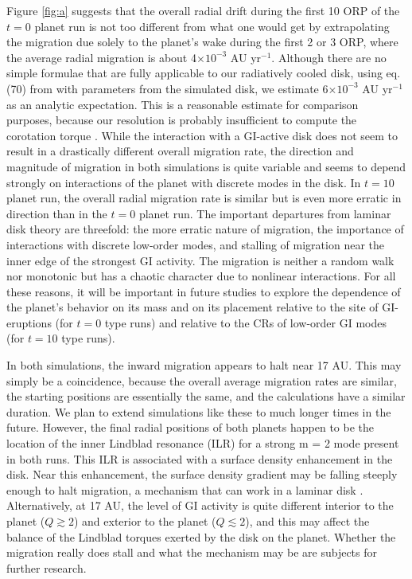 \documentclass[12pt,manuscript,authoryear]{aastex}
\begin{document}
Figure \ref{fig:a} suggests that the overall radial drift during the first 10 ORP of the $t = 0$ planet run is not too different from what one would get by extrapolating the migration due solely to the planet's wake during the first 2 or 3 ORP, where the average radial migration is about 4$\times10^{-3}$ AU yr$^{-1}$. Although there are no simple formulae that are fully applicable to our radiatively cooled disk, using eq. (70) from \citet{tanaka2002} with parameters from the simulated disk, we estimate 6$\times10^{-3}$ AU yr$^{-1}$ as an analytic expectation. This is a reasonable estimate for comparison purposes, because our resolution is probably insufficient to compute the corotation torque \citep{paardekooper2010}. 
While the interaction with a GI-active disk does not seem to result in a drastically different overall migration rate, the direction and magnitude of migration in both simulations is quite variable and seems to depend strongly on interactions of the planet with discrete modes in the disk. In $t = 10$ planet run, the overall radial migration rate is similar but is even more erratic in direction than in the $t = 0$ planet run. The important departures from laminar disk theory are threefold: the more erratic nature of migration, the importance of interactions with discrete low-order modes, and stalling of migration near the inner edge of the strongest GI activity. The migration is neither a random walk nor monotonic but has a chaotic character due to nonlinear interactions. For all these reasons, it will be important in future studies to explore the dependence of the planet's behavior on its mass and on its placement relative to the site of GI-eruptions (for $t = 0$ type runs) and relative to the CRs of low-order GI modes (for $t = 10$ type runs).

In both simulations, the inward migration appears to halt near 17 AU. This may simply be a coincidence, because the overall average migration rates are similar, the starting positions are essentially the same, and the calculations have a similar duration. We plan to extend simulations like these to much longer times in the future. However, the final radial positions of both planets happen to be the location of the inner Lindblad resonance (ILR) for a strong m = 2 mode present in both runs. This ILR is associated with a surface density enhancement in the disk. Near this enhancement, the surface density gradient may be falling steeply enough to halt migration, a mechanism that can work in a laminar disk \citep{paardekooper2009}. 
Alternatively, at 17 AU, the level of GI activity is quite different interior to the planet ($Q \gtrsim 2$) and exterior to the planet ($Q \lesssim 2$), and this may affect the balance of the Lindblad torques exerted by the disk on the planet. Whether the migration really does stall and what the mechanism may be are subjects for further research.
\end{document}
